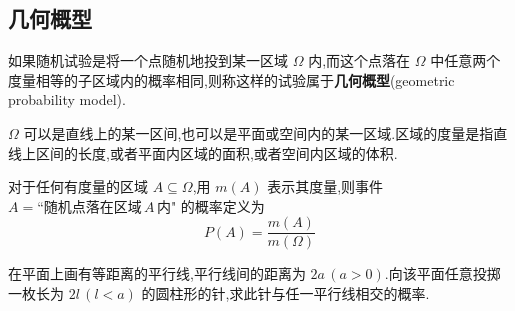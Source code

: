 \subsection{几何概型}

如果随机试验是将一个点随机地投到某一区域 $\varOmega$ 内,而这个点落在 $\varOmega$ 中任意两个度量相等的子区域内的概率相同,则称这样的试验属于\textbf{几何概型}(geometric probability model).

\begin{note}
    \indent $\varOmega$ 可以是直线上的某一区间,也可以是平面或空间内的某一区域.区域的度量是指直线上区间的长度,或者平面内区域的面积,或者空间内区域的体积.
\end{note}

对于任何有度量的区域 $A \subseteq \varOmega$,用 $m(A)$ 表示其度量,则事件 $A = \text{``随机点落在区域}\, A \,\text{内"}$ 的概率定义为
$$
P(A)=\dfrac{m(A)}{m(\varOmega)}
$$

\begin{example}[][蒲丰投针问题]
    \indent 在平面上画有等距离的平行线,平行线间的距离为 $2a \, (a>0)$.向该平面任意投掷一枚长为 $2l \, (l<a)$ 的圆柱形的针,求此针与任一平行线相交的概率.
\end{example}

